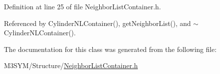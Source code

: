 Definition at line 25 of file Neighbor\+List\+Container.\+h.



Referenced by Cylinder\+N\+L\+Container(), get\+Neighbor\+List(), and $\sim$\+Cylinder\+N\+L\+Container().



The documentation for this class was generated from the following file\+:\begin{DoxyCompactItemize}
\item 
M3\+S\+Y\+M/\+Structure/\hyperlink{NeighborListContainer_8h}{Neighbor\+List\+Container.\+h}\end{DoxyCompactItemize}
